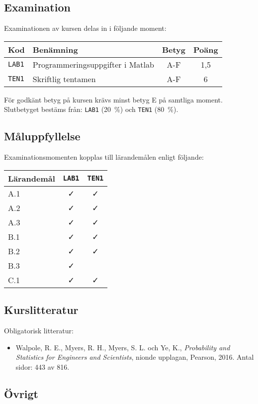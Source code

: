 \subsection*{Examination}

Examinationen av kursen delas in i följande moment:

\begin{longtable}[]{@{}llcc@{}}
\toprule
\textsf{Kod} & \textsf{Benämning} & \textsf{Betyg} & \textsf{Poäng}\tabularnewline
\midrule
\endhead
\texttt{LAB1} & Programmeringsuppgifter i Matlab & A-F & 1,5\tabularnewline
\texttt{TEN1} & Skriftlig tentamen & A-F & 6\tabularnewline
\bottomrule
\end{longtable}

För godkänt betyg på kursen krävs minst betyg E på samtliga moment.
Slutbetyget bestäms från: \texttt{LAB1} (20~\%) och \texttt{TEN1} (80~\%).

\subsection*{Måluppfyllelse}

Examinationsmomenten kopplas till lärandemålen enligt följande:

\begin{longtable}[]{@{}lcc@{}}
\toprule
\textsf{Lärandemål} & \texttt{LAB1} & \texttt{TEN1}\tabularnewline
\midrule
\endhead
A.1 & \faCheck & \faCheck\tabularnewline
A.2 & \faCheck & \faCheck\tabularnewline
A.3 & \faCheck & \faCheck\tabularnewline
B.1 & \faCheck & \faCheck\tabularnewline
B.2 & \faCheck & \faCheck\tabularnewline
B.3 & \faCheck &\tabularnewline
C.1 & \faCheck & \faCheck\tabularnewline
\bottomrule
\end{longtable}

\subsection*{Kurslitteratur}

Obligatorisk litteratur:

\begin{itemize}
\tightlist
\item
  Walpole, R. E., Myers, R. H., Myers, S. L. och Ye, K.,
  \emph{Probability and Statistics for Engineers and Scientists}, nionde
  upplagan, Pearson, 2016. Antal sidor: 443 av 816.
\end{itemize}

\subsection*{Övrigt}

